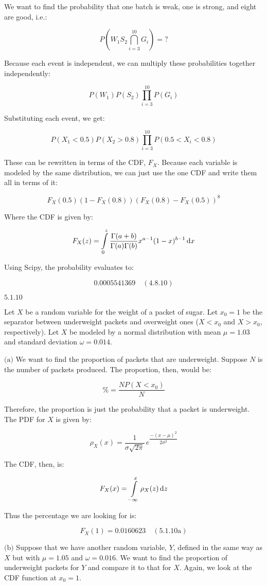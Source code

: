 \documentclass{article}
\newcommand{\problem}[2]{$\boxed{\text{#1.#2}}$}
\newcommand{\subproblem}[3]{$\boxed{\text{(#3)}}$}
\newcommand{\solution}[3]{\boxed{#3\quad(\text{#1.#2})}}
\newcommand{\subsolution}[4]{\boxed{#4\quad(\text{#1.#2#3})}}
\renewcommand{\d}[1]{\,\textnormal{d}#1}
\begin{document}
We want to find the probability that one batch is weak, one is strong,
and eight are good, i.e.:

\[
P\left(W_1S_2\bigcap\limits_{i=3}^{10} G_i\right)=?
\]

Because each event is independent, we can multiply these probabilities
together independently:

\[
P(W_1)P(S_2)\prod\limits_{i=3}^{10}P(G_i)
\]

Substituting each event, we get:

\[
P(X_1<0.5)P(X_2>0.8)\prod\limits_{i=3}^{10}P(0.5<X_i<0.8)
\]

These can be rewritten in terms of the CDF, $F_X$. Because each
variable is modeled by the same distribution, we can just use the one
CDF and write them all in terms of it:

\[
F_X(0.5)(1-F_X(0.8))\left(F_X(0.8)-F_X(0.5)\right)^8
\]

Where the CDF is given by:

\[
F_X(z)=\int\limits_{0}^{z} \dfrac{\Gamma(a+b)}{\Gamma(a)\Gamma(b)} x^{a-1}(1-x)^{b-1}\d{x}
\]

Using Scipy, the probability evaluates to:

\[
\solution{4.8}{10}{0.0005541369}
\]

%
\problem{5.1}{10}

Let $X$ be a random variable for the weight of a packet of sugar. Let
$x_0=1$ be the separator between underweight packets and overweight
ones ($X<x_0$ and $X>x_0$, respectively). Let $X$ be modeled by a
normal distribution with mean $\mu=1.03$ and standard deviation
$\omega=0.014$.

%
\subproblem{5.1}{10}{a} We want to find the proportion of packets that
are underweight. Suppose $N$ is the number of packets produced. The
proportion, then, would be:

\[
\% = \frac{N P(X<x_0)}{N}
\]

Therefore, the proportion is just the probability that a packet is
underweight. The PDF for $X$ is given by:

\[
\rho_X(x)=\dfrac{1}{\sigma \sqrt{2\pi}}\,e^{\dfrac{-(x-\mu)^2}{2\sigma^2}}
\]

The CDF, then, is:

\[
F_X(x)=\int\limits_{-\infty}^x \rho_X(z)\d{z}
\]

Thus the percentage we are looking for is:

\[
\subsolution{5.1}{10}{a}{F_X(1)=0.0160623}
\]

%
\subproblem{5.1}{10}{b} Suppose that we have another random variable,
$Y$, defined in the same way as $X$ but with $\mu=1.05$ and
$\omega=0.016$. We want to find the proportion of underweight packets
for $Y$ and compare it to that for $X$. Again, we look at the CDF
function at $x_0=1$.
\end{document}
